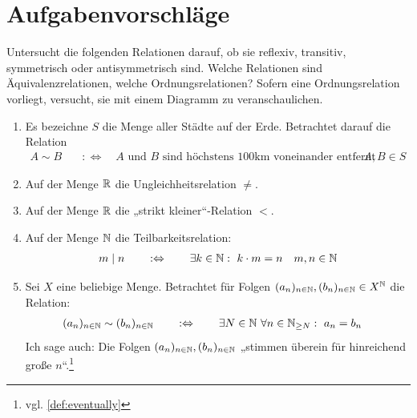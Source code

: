 \clearpage
\section{Aufgabenvorschläge}


\begin{aufg} \label{aufg:relationen}
    Untersucht die folgenden Relationen darauf, ob sie reflexiv, transitiv, symmetrisch oder antisymmetrisch sind. Welche Relationen sind Äquivalenzrelationen, welche Ordnungsrelationen? Sofern eine Ordnungsrelation vorliegt, versucht, sie mit einem Diagramm zu veranschaulichen.
    \begin{enumerate}
        \item Es bezeichne $S$ die Menge aller Städte auf der Erde. Betrachtet darauf die Relation
        \begin{align*}
            A \sim B \quad& :\Leftrightarrow\quad \text{$A$ und $B$ sind höchstens 100km voneinander entfernt} && A,B\in S
        \end{align*}
        \item Auf der Menge $\mathbb R$ die Ungleichheitsrelation $\neq$.
        \item Auf der Menge $\mathbb R$ die „strikt kleiner“-Relation $<$.
        \item Auf der Menge $\mathbb N$ die Teilbarkeitsrelation:
        \begin{align*}
            m\mid n \qquad:\Leftrightarrow\qquad \exists k\in \N:\ k\cdot m=n && m,n\in \N
        \end{align*}
        \item Sei $X$ eine beliebige Menge. Betrachtet für Folgen $(a_n)_{n\in \mathbb N},(b_n)_{n\in \mathbb N} \in X^\mathbb N$ die Relation:
        \begin{align*}
            (a_n)_{n\in \N} \sim (b_n)_{n\in \N} \qquad & :\Leftrightarrow\qquad \exists N\in \N\ \forall n\in \N_{\ge N}:\ a_n=b_n
        \end{align*}
            Ich sage auch: Die Folgen $(a_n)_{n\in \mathbb N},(b_n)_{n\in \mathbb N}$ „stimmen überein für hinreichend große $n$“.\footnote{vgl. \cref{def:eventually}}
    \end{enumerate}
\end{aufg}


